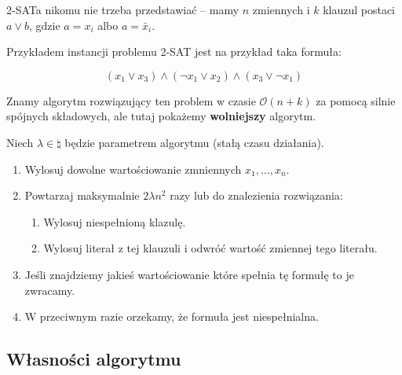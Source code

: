 2-SATa nikomu nie trzeba przedstawiać -- mamy \( n \) zmiennych i \( k \) klauzul postaci \( a \lor b \), gdzie \( a = x_i \) albo \( a = \bar x_i \).

Przykładem instancji problemu 2-SAT jest na przykład taka formuła:

\[ 
    (x_1 \lor x_3) \land (\neg x_1 \lor x_2) \land (x_3 \lor \neg x_1)
\]

Znamy algorytm rozwiązujący ten problem w czasie \( \mathcal{O}(n + k) \) za pomocą silnie spójnych składowych, ale tutaj pokażemy \textbf{wolniejszy} algorytm.

Niech \( \lambda \in \natural \) będzie parametrem algorytmu (stałą czasu działania).
\begin{enumerate}
    \item Wylosuj dowolne wartościowanie zmniennych \( x_1, \dots, x_n \).
    \item Powtarzaj maksymalnie \( 2\lambda n^2 \) razy lub do znalezienia rozwiązania:
    \begin{enumerate}
        \item Wylosuj niespełnioną klazulę.
        \item Wylosuj literał z tej klauzuli i odwróć wartość zmiennej tego literału.
    \end{enumerate}
    \item Jeśli znajdziemy jakieś wartościowanie które spełnia tę formułę to je zwracamy.
    \item W przeciwnym razie orzekamy, że formuła jest niespełnialna.
\end{enumerate}

\subsection{Własności algorytmu}

